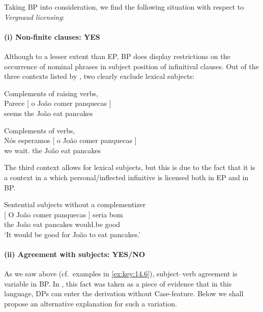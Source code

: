 \documentclass[output=paper]{langsci/langscibook}
\begin{document}
Taking \gls{BP} into consideration, we find the
following situation with respect to \emph{Vergnaud licensing}:

\paragraph*{(i) Non-finite clauses: YES}

Although to a lesser extent than \gls{EP},
\gls{BP} does display restrictions
on the occurrence of nominal phrases in subject position of infinitival
clauses. Out of the three contexts listed by \textcite{SheevanderWal2018}, two
clearly exclude lexical subjects:

\ea\label{ex:key:14.23}Complements of raising verbs, \\
    \gll    \llap{*}Parece [ o João comer panquecas ]\\
            seems {} the João eat pancakes {}\\
\z

\ea\label{ex:key:14.24}Complements of  verbs, \\
    \gll    \llap{*}Nós esperamos [ o João comer panquecas ]\\
            we wait.\Fpl{} {} the João eat pancakes {}\\
\z

The third context allows for lexical subjects, but this is due to the fact that
it is a context in a which personal/inflected infinitive is licensed both in
\gls{EP} and in BP.

\ea\label{ex:key:14.25}Sentential subjects without a
complementizer\\
    \gll    {}[ O João comer panquecas ] seria bom\\
            {} the João eat pancakes {} would.be good\\
    \glt    \enquote*{It would be good for João to eat pancakes.}
\z

\paragraph*{(ii) Agreement with subjects: YES/NO}

As we saw above (cf.\ examples in \eqref{ex:key:14.6}), subject--verb agreement is
variable in BP. In \textcite{AvelarGalves2011,AvelarGalves2016}, this fact was taken as a
piece of evidence that in this language, DPs can enter the derivation without
Case-feature. Below we shall propose an alternative explanation for such a
variation.
\end{document}
